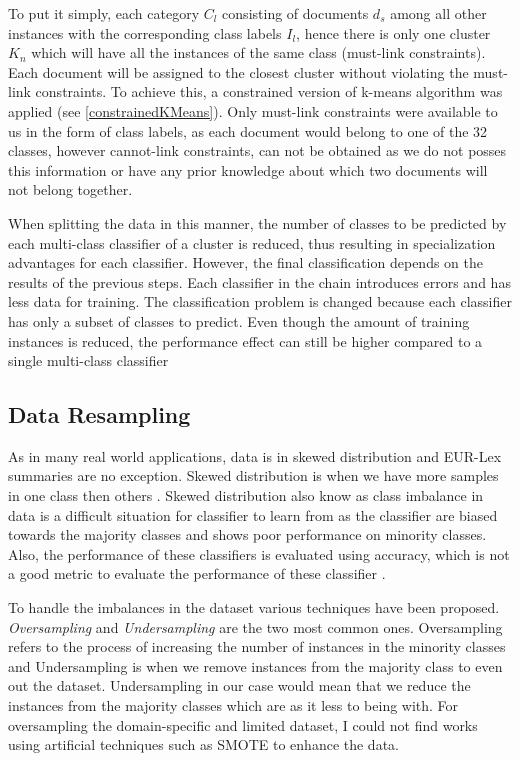 
To put it simply, each category $C_{l}$ consisting of documents $d_{s}$ among all other instances with the corresponding class labels $I_{l}$, hence there is only one cluster $K_{n}$ which will have all the instances of the same class (must-link constraints). Each document will be assigned to the closest cluster without violating the must-link constraints. To achieve this, a constrained version of k-means algorithm was applied (see \ref{constrainedKMeans}). Only must-link constraints were available to us in the form of class labels, as each document would belong to one of the 32 classes, however cannot-link constraints, can not be obtained as we do not posses this information or have any prior knowledge about which two documents will not belong together. 

When splitting the data in this manner, the number of classes to be predicted by each multi-class classifier of a cluster is reduced, thus resulting in specialization advantages for each classifier. However, the final classification depends on the results of the previous steps. Each classifier in the chain introduces errors and has less data for training. The classification problem is changed because each classifier has only a subset of classes to predict. Even though the amount of training instances is reduced, the performance effect can still be higher compared to a single multi-class classifier

\subsection*{Data Resampling}

As in many real world applications, data is in skewed distribution and EUR-Lex summaries are no exception. Skewed distribution is when we have more samples in one class then others \cite{wang2012multiclass}. Skewed distribution also know as class imbalance in data is a difficult situation for classifier to learn from as the classifier are biased towards the majority classes and shows poor performance on minority classes. Also, the performance of these classifiers is evaluated using accuracy, which is not a good metric to evaluate the performance of these classifier \cite{chawla2002smote}.  

To handle the imbalances in the dataset various techniques have been proposed. \textit{Oversampling} and \textit{Undersampling} are the two most common ones. Oversampling refers to the process of increasing the number of instances in the minority classes and Undersampling is when we remove instances from the majority class to even out the dataset. Undersampling in our case would mean that we reduce the instances from the majority classes which are as it less to being with. For oversampling the domain-specific and limited dataset, I could not find works using artificial techniques such as SMOTE to enhance the data. 

